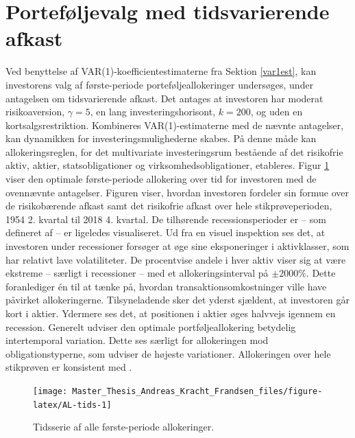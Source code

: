 \documentclass[
  a4paper,
  oneside]{memoir}
\begin{document}
\hypertarget{portvalgmedtids}{%
\section{Porteføljevalg med tidsvarierende afkast}\label{portvalgmedtids}}

Ved benyttelse af VAR(1)-koefficientestimaterne fra Sektion \ref{var1est}, kan investorens valg af første-periode porteføljeallokeringer undersøges, under antagelsen om tidsvarierende afkast. Det antages at investoren har moderat risikoaversion, \(\gamma=5\), en lang investeringshorisont, \(k=200\), og uden en kortsalgsrestriktion. Kombineres VAR(1)-estimaterne med de nævnte antagelser, kan dynamikken for investeringsmulighederne skabes. På denne måde kan allokeringsreglen, for det multivariate investeringsrum bestående af det risikofrie aktiv, aktier, statsobligationer og virksomhedsobligationer, etableres. Figur \ref{fig:AL-tids} viser den optimale første-periode allokering over tid for investoren med de ovennævnte antagelser. Figuren viser, hvordan investoren fordeler sin formue over de risikobærende afkast samt det risikofrie afkast over hele stikprøveperioden, 1954 2. kvartal til 2018 4. kvartal. De tilhørende recessionsperioder er -- som defineret af \citep{NBER2020} -- er ligeledes visualiseret. Ud fra en visuel inspektion ses det, at investoren under recessioner forsøger at øge sine eksponeringer i aktivklasser, som har relativt lave volatiliteter. De procentvise andele i hver aktiv viser sig at være ekstreme -- særligt i recessioner -- med et allokeringsinterval på \(\pm 2000\%\). Dette foranlediger én til at tænke på, hvordan transaktionsomkostninger ville have påvirket allokeringerne. Tilsyneladende sker det yderst sjældent, at investoren går kort i aktier. Ydermere ses det, at positionen i aktier øges halvvejs igennem en recession. Generelt udviser den optimale portføljeallokering betydelig intertemporal variation. Dette ses særligt for allokeringen mod obligationstyperne, som udviser de højeste variationer. Allokeringen over hele stikprøven er konsistent med \citep{JurVic2011}.

\begin{figure}[H]

{\centering \texttt{[image: Master\_Thesis\_Andreas\_Kracht\_Frandsen\_files/figure-latex/AL-tids-1]} 

}

\caption{Tidsserie af alle første-periode allokeringer.}\label{fig:AL-tids}
\end{figure}
\end{document}
